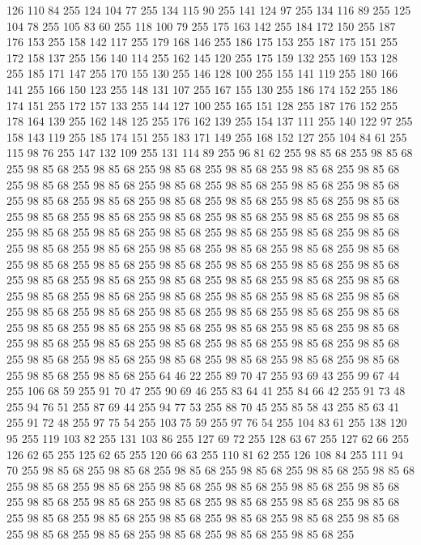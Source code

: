 126 110 84 255 124 104 77 255 134 115 90 255 141 124 97 255 134 116 89 255 125 104 78 255 105 83 60 255 118 100 79 255 175 163 142 255 184 172 150 255 187 176 153 255 158 142 117 255 179 168 146 255 186 175 153 255 187 175 151 255 172 158 137 255 156 140 114 255 162 145 120 255 175 159 132 255 169 153 128 255 185 171 147 255 170 155 130 255 146 128 100 255 155 141 119 255 180 166 141 255 166 150 123 255 148 131 107 255 167 155 130 255 186 174 152 255 186 174 151 255 172 157 133 255 144 127 100 255 165 151 128 255 187 176 152 255 178 164 139 255 162 148 125 255 176 162 139 255 154 137 111 255 140 122 97 255 158 143 119 255 185 174 151 255 183 171 149 255 168 152 127 255 104 84 61 255 115 98 76 255 147 132 109 255 131 114 89 255 96 81 62 255 98 85 68 255 98 85 68 255 98 85 68 255 98 85 68 255 98 85 68 255 98 85 68 255 98 85 68 255 98 85 68 255 98 85 68 255 98 85 68 255 98 85 68 255 98 85 68 255 98 85 68 255 98 85 68 255 98 85 68 255 98 85 68 255
98 85 68 255 98 85 68 255 98 85 68 255 98 85 68 255 98 85 68 255 98 85 68 255 98 85 68 255 98 85 68 255 98 85 68 255 98 85 68 255 98 85 68 255 98 85 68 255 98 85 68 255 98 85 68 255 98 85 68 255 98 85 68 255 98 85 68 255 98 85 68 255 98 85 68 255 98 85 68 255 98 85 68 255 98 85 68 255 98 85 68 255 98 85 68 255 98 85 68 255 98 85 68 255 98 85 68 255 98 85 68 255 98 85 68 255 98 85 68 255 98 85 68 255 98 85 68 255 98 85 68 255 98 85 68 255 98 85 68 255 98 85 68 255 98 85 68 255 98 85 68 255 98 85 68 255 98 85 68 255 98 85 68 255 98 85 68 255 98 85 68 255 98 85 68 255 98 85 68 255 98 85 68 255 98 85 68 255 98 85 68 255 98 85 68 255 98 85 68 255 98 85 68 255 98 85 68 255 98 85 68 255 98 85 68 255 98 85 68 255 98 85 68 255 98 85 68 255 98 85 68 255 98 85 68 255 98 85 68 255 98 85 68 255 98 85 68 255 98 85 68 255 98 85 68 255
98 85 68 255 98 85 68 255 64 46 22 255 89 70 47 255 93 69 43 255 99 67 44 255 106 68 59 255 91 70 47 255 90 69 46 255 83 64 41 255 84 66 42 255 91 73 48 255 94 76 51 255 87 69 44 255 94 77 53 255 88 70 45 255 85 58 43 255 85 63 41 255 91 72 48 255 97 75 54 255 103 75 59 255 97 76 54 255 104 83 61 255 138 120 95 255 119 103 82 255 131 103 86 255 127 69 72 255 128 63 67 255 127 62 66 255 126 62 65 255 125 62 65 255 120 66 63 255 110 81 62 255 126 108 84 255 111 94 70 255 98 85 68 255 98 85 68 255 98 85 68 255 98 85 68 255 98 85 68 255 98 85 68 255 98 85 68 255 98 85 68 255 98 85 68 255 98 85 68 255 98 85 68 255 98 85 68 255 98 85 68 255 98 85 68 255 98 85 68 255 98 85 68 255 98 85 68 255 98 85 68 255 98 85 68 255 98 85 68 255 98 85 68 255 98 85 68 255 98 85 68 255 98 85 68 255 98 85 68 255 98 85 68 255 98 85 68 255 98 85 68 255 98 85 68 255
